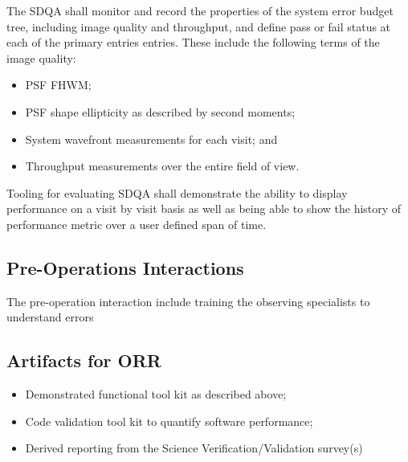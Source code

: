 The SDQA shall monitor and record the properties of the system error budget tree, including image quality and throughput, and define pass or fail status at each of the primary entries entries.   These include the following terms of the image quality: 

\begin{itemize}

	\item PSF FHWM;
	\item PSF shape ellipticity as described by second moments;
	\item System wavefront measurements for each visit; and
	\item Throughput measurements over the entire field of view.
		
\end{itemize}

Tooling for evaluating SDQA shall demonstrate the ability to display performance on a visit by visit basis as well as being able to show the history of performance metric over a user defined span of time.

\subsection{Pre-Operations Interactions}
The pre-operation interaction include training the observing specialists to understand errors 

\subsection{Artifacts for ORR}

\begin{itemize}

	\item Demonstrated functional tool kit as described above;
	\item Code validation tool kit to quantify software performance;
	\item Derived reporting from the Science Verification/Validation survey(s)
	
\end{itemize}






